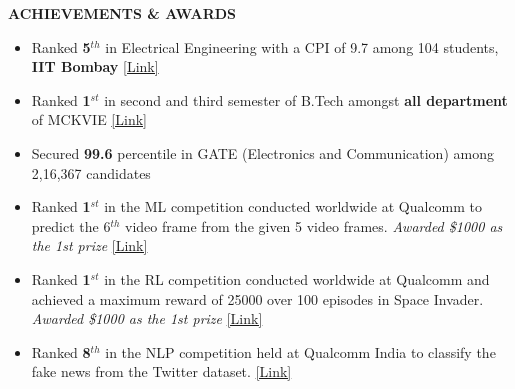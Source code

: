 \documentclass{article}
\begin{document}
  \begin{theorem}
   \vspace{-0.7mm}
\begin{center}
\textbf{ACHIEVEMENTS \& AWARDS
}\end{center}  
\vspace{-0.7mm}    
   \end{theorem}
\vspace{-3mm}
\begin{itemize}
\setlength{\itemsep}{-0.10em}

\item Ranked \textbf{5$^{th}$}  in Electrical Engineering with a CPI of 9.7 among 104 students, \textbf{IIT Bombay}   
\hfill{\href{https://drive.google.com/file/d/1U6Im2h50TI0gOA6D1DFieJkynd2bFfO8/view?usp=sharing}{[Link]}}

\item Ranked \textbf{1$^{st}$} in second and third semester of B.Tech amongst  \textbf{all department} of MCKVIE
\hfill{\href{https://drive.google.com/file/d/10DtgyOHx6U-QuMhRV5mqdkzQtUtz9Cem/view}{[Link]}}
 

\item Secured \textbf{99.6} percentile in GATE (Electronics and Communication) among 2,16,367 candidates


\item Ranked \textbf{1$^{st}$} in the ML competition conducted  worldwide at Qualcomm to predict the {6$^{th}$} video frame from the given 5 video frames. \textit{Awarded \$1000 as the 1st prize} 
\hfill{\href{https://drive.google.com/file/d/1uwSr-1dlImn5JYRzPpn62ublzCWKSGr0/view?usp=sharing}{[Link]}}



\item Ranked \textbf{1$^{st}$} in the RL competition conducted worldwide at Qualcomm  and achieved a maximum reward of 25000 over 100 episodes in Space Invader.  \textit{Awarded \$1000 as the 1st prize} 
\hfill{\href{https://drive.google.com/file/d/13voQkZ9kiybTD-pCkeTBRxmi9IeBtqnG/view?usp=sharing}{[Link]}}





\item Ranked \textbf{8$^{th}$} in the NLP competition held at Qualcomm India to classify the fake news from the Twitter dataset.
\hfill{\href{https://drive.google.com/file/d/1mOlilPLZSuHSyqRIVukRvXs_700Hmz5I/view?usp=sharing}{[Link]}}




\end{itemize}
\vspace{-2mm}




\end{document}
